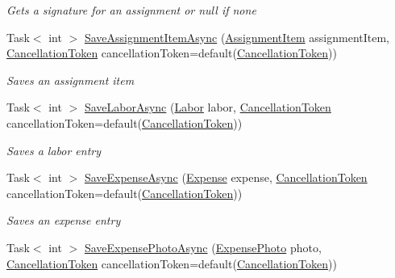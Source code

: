 \begin{DoxyCompactItemize}
\begin{DoxyCompactList}\small\item\em Gets a signature for an assignment or null if none \end{DoxyCompactList}\item 
Task$<$ int $>$ \hyperlink{interface_field_service_1_1_i_assignment_service_ab2092c8146bdf27e85e71a53d3814124}{Save\+Assignment\+Item\+Async} (\hyperlink{class_field_service_1_1_data_1_1_assignment_item}{Assignment\+Item} assignment\+Item, \hyperlink{_view_models_2_assignment_view_model_8cs_aba80ec766846c61f55644fd23860cb18}{Cancellation\+Token} cancellation\+Token=default(\hyperlink{_view_models_2_assignment_view_model_8cs_aba80ec766846c61f55644fd23860cb18}{Cancellation\+Token}))
\begin{DoxyCompactList}\small\item\em Saves an assignment item \end{DoxyCompactList}\item 
Task$<$ int $>$ \hyperlink{interface_field_service_1_1_i_assignment_service_a1f51a353c2f1d218f4f35f57641e5b46}{Save\+Labor\+Async} (\hyperlink{class_field_service_1_1_data_1_1_labor}{Labor} labor, \hyperlink{_view_models_2_assignment_view_model_8cs_aba80ec766846c61f55644fd23860cb18}{Cancellation\+Token} cancellation\+Token=default(\hyperlink{_view_models_2_assignment_view_model_8cs_aba80ec766846c61f55644fd23860cb18}{Cancellation\+Token}))
\begin{DoxyCompactList}\small\item\em Saves a labor entry \end{DoxyCompactList}\item 
Task$<$ int $>$ \hyperlink{interface_field_service_1_1_i_assignment_service_a3de5214ff7925731e8c265eff98c8c0e}{Save\+Expense\+Async} (\hyperlink{class_field_service_1_1_data_1_1_expense}{Expense} expense, \hyperlink{_view_models_2_assignment_view_model_8cs_aba80ec766846c61f55644fd23860cb18}{Cancellation\+Token} cancellation\+Token=default(\hyperlink{_view_models_2_assignment_view_model_8cs_aba80ec766846c61f55644fd23860cb18}{Cancellation\+Token}))
\begin{DoxyCompactList}\small\item\em Saves an expense entry \end{DoxyCompactList}\item 
Task$<$ int $>$ \hyperlink{interface_field_service_1_1_i_assignment_service_a8f9a4283536bb493635765d68e12f38b}{Save\+Expense\+Photo\+Async} (\hyperlink{class_field_service_1_1_data_1_1_expense_photo}{Expense\+Photo} photo, \hyperlink{_view_models_2_assignment_view_model_8cs_aba80ec766846c61f55644fd23860cb18}{Cancellation\+Token} cancellation\+Token=default(\hyperlink{_view_models_2_assignment_view_model_8cs_aba80ec766846c61f55644fd23860cb18}{Cancellation\+Token}))

\end{DoxyCompactItemize}

